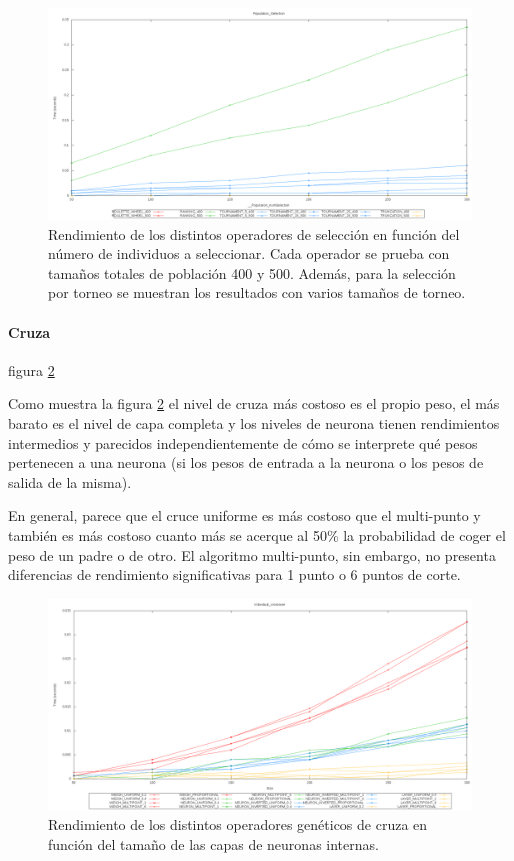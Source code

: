 \documentclass[11pt]{article}
\begin{document}
\begin{titlepage}
\begin{figure}[htb]
\centering
\includegraphics[width=\textwidth]{./img/Population_Selection.png}
\caption{\label{rendGenSelect}Rendimiento de los distintos operadores de selección en función del número de individuos a seleccionar. Cada operador se prueba con tamaños totales de población 400 y 500. Además, para la selección por torneo se muestran los resultados con varios tamaños de torneo.}
\end{figure}
\newpage
\paragraph{Cruza}
\label{sec-6-1-2-2}


figura \ref{rendGenCruza}

Como muestra la figura \ref{rendGenCruza} el nivel de cruza más costoso es el propio peso, el más barato es el nivel de capa completa y los niveles de neurona tienen rendimientos intermedios y parecidos independientemente de cómo se interprete qué pesos pertenecen a una neurona (si los pesos de entrada a la neurona o los pesos de salida de la misma).

En general, parece que el cruce uniforme es más costoso que el multi-punto y también es más costoso cuanto más se acerque al 50\% la probabilidad de coger el peso de un padre o de otro. El algoritmo multi-punto, sin embargo, no presenta diferencias de rendimiento significativas para 1 punto o 6 puntos de corte.

\begin{figure}[htb]
\centering
\includegraphics[width=\textwidth]{./img/Individual_crossover.png}
\caption{\label{rendGenCruza}Rendimiento de los distintos operadores genéticos de cruza en función del tamaño de las capas de neuronas internas.}
\end{figure}
\newpage

\end{titlepage}
\end{document}
